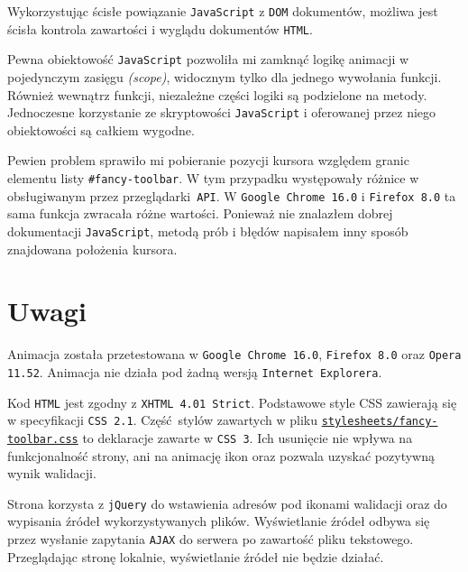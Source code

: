 \documentclass[10pt,a4paper]{article}
\newcommand{\f}[1]{\texttt{#1}}
\begin{document}
Wykorzystując ścisłe powiązanie \f{JavaScript} z \f{DOM} dokumentów, możliwa
jest ścisła kontrola zawartości i wyglądu dokumentów \f{HTML}.

Pewna obiektowość \f{JavaScript} pozwoliła mi zamknąć logikę animacji w
pojedynczym zasięgu \emph{(scope)}, widocznym tylko dla jednego wywołania
funkcji. Również wewnątrz funkcji, niezależne części logiki są podzielone na
metody. Jednoczesne korzystanie ze skryptowości \f{JavaScript} i oferowanej
przez niego obiektowości są całkiem wygodne.

Pewien problem sprawiło mi pobieranie pozycji kursora względem granic elementu
listy \f{\#fancy-toolbar}. W tym przypadku występowały różnice w obsługiwanym
przez przeglądarki \f{API}. W \f{Google Chrome 16.0} i \f{Firefox 8.0} ta sama
funkcja zwracała różne wartości. Ponieważ nie znalazłem dobrej dokumentacji
\f{JavaScript}, metodą prób i błędów napisałem inny sposób znajdowana położenia
kursora.



\section{Uwagi}

Animacja została przetestowana w \f{Google Chrome 16.0}, \f{Firefox 8.0} oraz
\f{Opera 11.52}. Animacja nie działa pod żadną wersją \f{Internet Explorera}. 

Kod \f{HTML} jest zgodny z \f{XHTML 4.01 Strict}. Podstawowe style CSS zawierają
się w specyfikacji \f{CSS 2.1}. Część stylów zawartych w pliku
\href{https://github.com/student-tomasz/pi-cwiczenie-2/tree/b3f54b187e99c161f7a6780524f504c9fd1b00dd/stylesheets/fancy-toolbar.css}{\f{stylesheets/fancy-toolbar.css}}
to deklaracje zawarte w \f{CSS 3}. Ich usunięcie nie wpływa na funkcjonalność
strony, ani na animację ikon oraz pozwala uzyskać pozytywną wynik walidacji.

Strona korzysta z \f{jQuery} do wstawienia adresów pod ikonami walidacji oraz do
wypisania źródeł wykorzystywanych plików. Wyświetlanie źródeł odbywa się przez
wysłanie zapytania \f{AJAX} do serwera po zawartość pliku tekstowego.
Przeglądając stronę lokalnie, wyświetlanie źródeł nie będzie działać.
\end{document}
